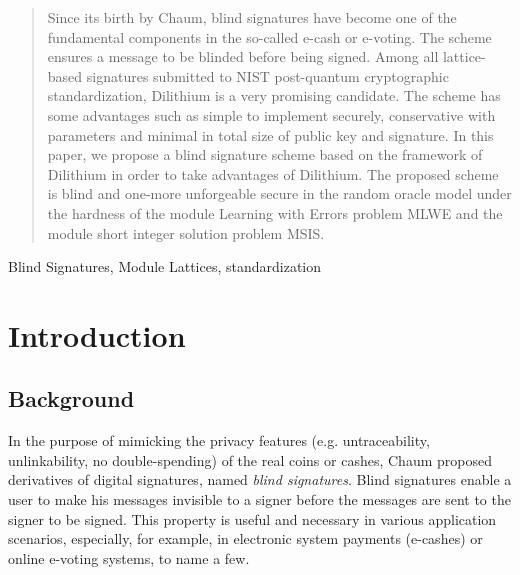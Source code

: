 \documentclass[conference]{IEEEtran}
\begin{document}
	\begin{abstract}
		Since its birth by Chaum, blind signatures have become one of the fundamental components in the so-called e-cash or e-voting. The scheme ensures a message to be blinded before being signed. 
		Among all lattice-based signatures submitted to NIST post-quantum cryptographic standardization, \textsf{Dilithium} is a very promising candidate. The scheme has some advantages such as simple to implement securely, conservative with parameters and minimal in total size of public key and signature. In this paper, we propose a blind signature scheme based on the framework of \textsf{Dilithium} in order to take advantages of  \textsf{Dilithium}. The proposed scheme is blind and one-more unforgeable secure in the random oracle model under the hardness of the module Learning with Errors   problem \textsf{MLWE} and the module short integer solution problem \textsf{MSIS}.
	\end{abstract}
	\begin{IEEEkeywords}
Blind Signatures, Module Lattices, standardization 
\end{IEEEkeywords}
	
	
	\section{Introduction}
	\subsection{Background}

	In the purpose of mimicking the privacy features (e.g. untraceability, unlinkability, no double-spending) of the real coins or cashes, Chaum \cite{Chau83} proposed derivatives of digital signatures, named \textit{blind signatures}. Blind signatures enable a user to make his messages invisible to a signer before the messages are sent to the signer to be signed. %
	 This property is useful and necessary in various application scenarios, especially, for example, in electronic system payments (e-cashes) or online e-voting systems, to name a few. 
	
\end{document}
